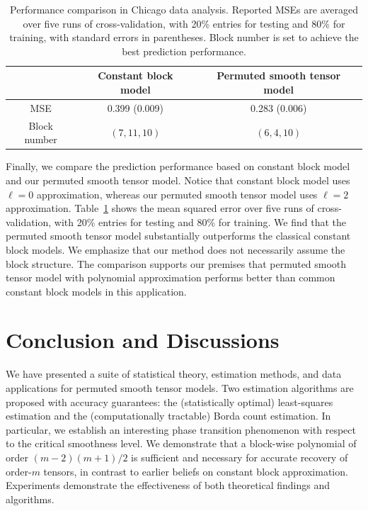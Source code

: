 \documentclass[11pt]{article}
\theoremstyle{definition}
\begin{document}
\begin{table}[htp!]
    \centering
    \begin{tabular}{c|c|c}
         &  Constant block model & Permuted smooth tensor model \\\hline
         
        MSE &   0.399 (0.009) &  0.283 (0.006)\\
        Block number &    $(7,11,10)$  & $(6,4,10)$
    \end{tabular}
    \caption{Performance comparison in Chicago data analysis. Reported MSEs are averaged
over five runs of cross-validation, with 20\% entries for testing and 80\% for training, with standard
errors in parentheses. Block number is set to achieve the best prediction performance.}\label{tab:MSE}
\end{table}

Finally, we compare the prediction performance based on constant block model and our permuted smooth tensor model. Notice that constant block model uses $\ell=0$ approximation, whereas our permuted smooth tensor model uses $\ell=2$ approximation. Table~\ref{tab:MSE} shows the mean squared error over five runs of cross-validation, with 20\% entries for testing and 80\% for training. We find that the permuted smooth tensor model substantially outperforms the classical constant block models. We emphasize that our method does not necessarily assume the block structure. The comparison supports our premises that permuted smooth tensor model with polynomial approximation performs better than common constant block models in this application. 




\section{Conclusion and Discussions}\label{sec:discussion}
We have presented a suite of statistical theory, estimation methods, and data applications for permuted smooth tensor models. Two estimation algorithms are proposed with accuracy guarantees: the (statistically optimal) least-squares estimation and the (computationally tractable) Borda count estimation. In particular, we establish an interesting phase transition phenomenon with respect to the critical smoothness level. We demonstrate that a block-wise polynomial of order $(m-2)(m+1)/2$ is sufficient and necessary for accurate recovery of order-$m$ tensors, in contrast to earlier beliefs on constant block approximation. Experiments demonstrate the effectiveness of both theoretical findings and algorithms. 
\end{document}
